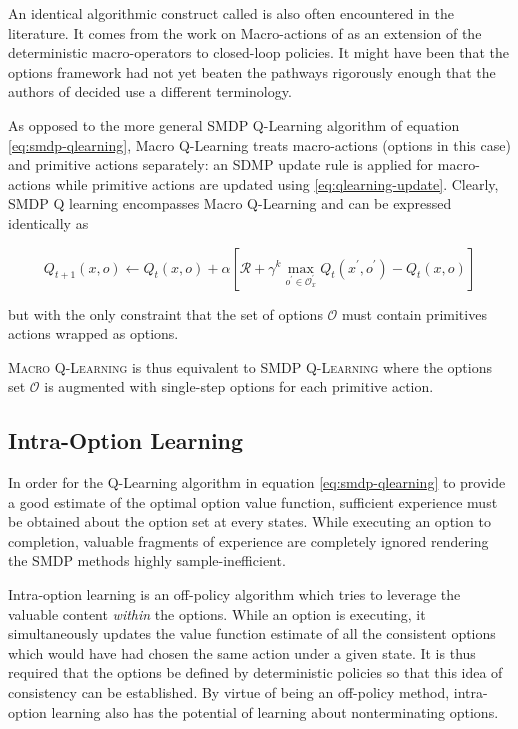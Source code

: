\documentclass[12pt, oneside, extrafontsizes]{memoir}  %
\newcommand{\termidx}[1]{\index{#1}{\textbf{#1}}}
\theoremstyle{plain}
\theoremstyle{definition}
\begin{document}
An identical algorithmic construct called \termidx{Macro Q-learning} is also often
encountered in the literature. It comes from the work on Macro-actions of
\cite{Mcgovern1997} as an extension of the deterministic macro-operators
\cite{Korf1985} to closed-loop policies. It might have been that the options framework
had not yet beaten the pathways rigorously enough that the authors of
\cite{Mcgovern1997} decided use a different terminology. 

As opposed to the more general SMDP Q-Learning algorithm of equation
\ref{eq:smdp-qlearning}, Macro Q-Learning treats macro-actions (options in this case)
and primitive actions separately: an SDMP update rule is applied for macro-actions
while primitive actions are updated using \ref{eq:qlearning-update}. Clearly, SMDP Q
learning encompasses Macro Q-Learning and can be expressed identically as

\begin{equation}
Q_{t+1}(x, o) \leftarrow Q_{t}(x, o) + \alpha \left[ \mathcal{R} + \gamma^k
\max_{o^\prime \in \mathcal{O}_x^\prime} Q_{t}(x^\prime, o^\prime) -
Q_t(x, o) \right]
\end{equation}

but with the only constraint that the set of options $\mathcal{O}$ must contain
primitives actions wrapped as options.

\textsc{Macro Q-Learning} is thus equivalent to \textsc{SMDP Q-Learning} where the
options set $\mathcal{O}$ is augmented with single-step options for each primitive
action.

\subsection{Intra-Option Learning}

In order for the Q-Learning algorithm in equation \ref{eq:smdp-qlearning} to provide a
good estimate of the optimal option value function, sufficient experience must be
obtained about the option set at every states. While executing an option to completion,
valuable fragments of experience are completely ignored rendering the SMDP methods
highly sample-inefficient.

Intra-option learning is an off-policy algorithm which tries to leverage the valuable
content \textit{within} the options. While an option is executing, it simultaneously
updates the value function estimate of all the consistent options which would have had
chosen the same action under a given state. It is thus required that the options be
defined by deterministic policies so that this idea of consistency can be established. 
By virtue of being an off-policy method, intra-option learning also has the potential of
learning about nonterminating options. 
\end{document}
